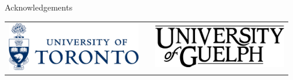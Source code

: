 \documentclass[final]{beamer}
\newlength{\sepwid}
\newlength{\onecolwid}
\begin{document}
\begin{frame}[t]
\begin{columns}[t]
\begin{column}{\onecolwid}
\begin{block}{Acknowledgements}
      \vspace{0.5in}
      \begin{center}
        \begin{tabular}{ccc}
          \includegraphics[width=3in]{TO.png} & \hspace{1.5in} & \includegraphics[width=3in]{guelph.png}
        \end{tabular}
      \end{center}
    \end{block}
  \end{column}
  \begin{column}{\sepwid}\end{column}			%
 \end{columns}
\end{frame}
\end{document}
